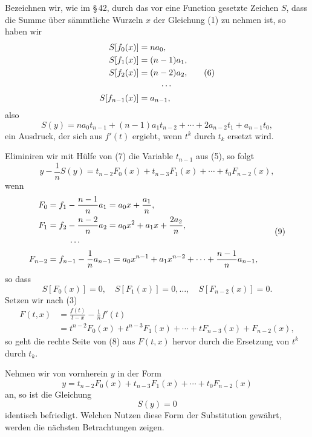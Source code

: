 \documentclass[11pt]{article}
\begin{document}
Bezeichnen wir, wie im \S\,42, durch das vor eine Function gesetzte Zeichen $S$, dass die Summe über sämmtliche Wurzeln $x$ der Gleichung (1) zu nehmen ist, so haben wir
\begin{equation}
\begin{aligned}
 S[f_0(x)]&=na_0,\\
 S[f_1(x)]&=(n-1)a_1,\\
 S[f_2(x)]&=(n-2)a_2,\\
 &\hspace{2.5em}\cdots\\
 S[f_{n-1}(x)]&=a_{n-1},
\end{aligned}
\tag{6}
\end{equation}
also
\begin{equation}
 S(y)=na_0t_{n-1}+(n-1)a_1t_{n-2}+\cdots+2a_{n-2}t_1+a_{n-1}t_0,
\tag{7}
\end{equation}
ein Ausdruck, der sich aus $f'(t)$ ergiebt, wenn $t^k$ durch $t_k$ ersetzt wird.

Eliminiren wir mit Hülfe von (7) die Variable $t_{n-1}$ aus (5), so folgt
\begin{equation}
 y-\frac1nS(y)=t_{n-2}F_0(x)+t_{n-3}F_1(x)+\cdots+t_0F_{n-2}(x),
\tag{8}
\end{equation}
wenn
\begin{equation}
\begin{aligned}
 F_0&=f_1-\frac{n-1}{n}a_1=a_0x+\frac{a_1}{n},\\
 F_1&=f_2-\frac{n-2}{n}a_2=a_0x^2+a_1x+\frac{2a_2}{n},\\
 &\hspace{2.5em}\cdots\\
 F_{n-2}&=f_{n-1}-\frac1n a_{n-1}=a_0x^{n-1}+a_1x^{n-2}+\cdots+\frac{n-1}{n}a_{n-1},
\end{aligned}
\tag{9}
\end{equation}
so dass
\begin{equation}
 S[F_0(x)]=0,
 \quad S[F_1(x)]=0,
 \ldots,
 \quad S[F_{n-2}(x)]=0.
\tag{10}
\end{equation}
Setzen wir nach (3)
\begin{equation}
\begin{aligned}
 F(t,x)&=\frac{f(t)}{t-x}-\frac1n f'(t)\\
 &=t^{n-2}F_0(x)+t^{n-3}F_1(x)+\cdots+tF_{n-3}(x)+F_{n-2}(x),
\end{aligned}
\tag{11}
\end{equation}
so geht die rechte Seite von (8) aus $F(t,x)$ hervor durch die Ersetzung von $t^k$ durch $t_k$.

Nehmen wir von vornherein $y$ in der Form
\begin{equation}
 y=t_{n-2}F_0(x)+t_{n-3}F_1(x)+\cdots+t_0F_{n-2}(x)
\tag{12}
\end{equation}
an, so ist die Gleichung
\begin{equation}
 S(y)=0
\tag{13}
\end{equation}
identisch befriedigt. Welchen Nutzen diese Form der Substitution gewährt, werden die nächsten Betrachtungen zeigen.
\end{document}
